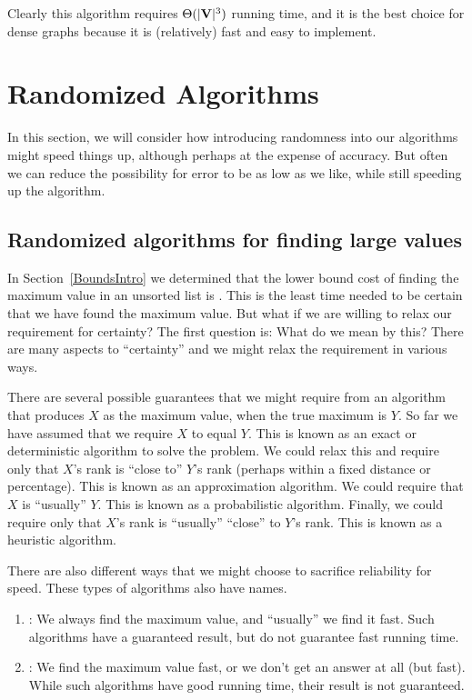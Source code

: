 \newpage


Clearly this algorithm requires $\Theta(|{\textbf{V}}|^3)$ running time, and
it is the best choice for dense graphs because it is (relatively) fast
and easy to implement.

\section{Randomized Algorithms}
\label{Sec:Random}

In this section, we will consider how introducing randomness into our
algorithms might speed things up, although perhaps at the expense of
accuracy.
But often we can reduce the possibility for error to be as low as we
like, while still speeding up the algorithm.

\subsection{Randomized algorithms for finding large values}

In Section~\ref{BoundsIntro} we determined that the lower bound
cost of finding the maximum value in an unsorted list is \Omegan.
This is the least time needed to be certain that we have found the
maximum value.
But what if we are willing to relax our requirement for certainty?
The first question is: What do we mean by this?
There are many aspects to ``certainty'' and we might relax the
requirement in various ways.

There are several possible guarantees that we might require from an
algorithm that produces $X$ as the maximum value, when the true
maximum is $Y$.
So far we have assumed that we require $X$ to equal $Y$.
This is known as an exact or deterministic algorithm to solve the
problem.
We could relax this and require only that $X$'s rank is ``close to''
$Y$'s rank (perhaps within a fixed distance or percentage).
This is known as an approximation algorithm.
We could require that $X$ is ``usually'' $Y$.
This is known as a probabilistic algorithm.
Finally, we could require only that $X$'s rank is ``usually''
``close'' to $Y$'s rank.
This is known as a heuristic algorithm.

There are also different ways that we might choose to sacrifice
reliability for speed.
These types of algorithms also have names.
\begin{enumerate}
\item {}:
We always find the maximum value, and ``usually'' we find it fast.
Such algorithms have a guaranteed result, but do not guarantee fast
running time.
\item {}:
We find the maximum value fast, or we don't get an answer at all
(but fast).
While such algorithms have good running time, their result is not
guaranteed.
\end{enumerate}

